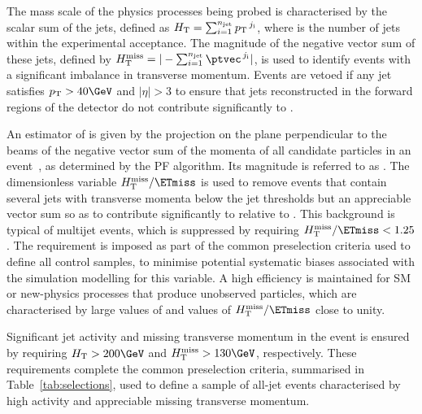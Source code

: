 The mass scale of the physics processes being probed is characterised
by the scalar \Pt sum of the jets, defined as $\scalht =
\sum_{i=1}^{\njet} \Pt^{\,j_\text{i}}$, where \njet is the number of
jets within the experimental acceptance.  The magnitude of the
negative vector \ptvec sum of these jets, defined by $\HTmiss =
|-\sum_{i=1}^{\njet} \ptvec^{\,j_\text{i}}|$, is used to identify
events with a significant imbalance in transverse momentum. Events are
vetoed if any jet satisfies $\Pt > 40\GeV$ and $|\eta| > 3$ to ensure
that jets reconstructed in the forward regions of the detector do not
contribute significantly to \HTmiss.

An estimator of \ptvecmiss is given by the projection on the plane
perpendicular to the beams of the negative vector sum of the momenta
of all candidate particles in an event~\cite{cms-met}, as determined
by the PF algorithm. Its magnitude is referred to as \ETmiss. The
dimensionless variable $\HTmiss / \ETmiss$ is used to remove events
that contain several jets with transverse momenta below the jet \Pt
thresholds but an appreciable \Pt vector sum so as to contribute
significantly to \HTmiss relative to \ETmiss. This background is
typical of multijet events, which is suppressed by requiring $\HTmiss
/ \ETmiss < 1.25$. The requirement is imposed as part of the common
preselection criteria used to define all control samples, to minimise
potential systematic biases associated with the simulation modelling
for this variable. A high efficiency is maintained for SM or
new-physics processes that produce unobserved particles, which are
characterised by large values of \ptvecmiss and values of $\HTmiss /
\ETmiss$ close to unity.

Significant jet activity and missing transverse momentum in the event
is ensured by requiring $\scalht > 200\GeV$ and $\HTmiss > 130\GeV$,
respectively. These requirements complete the common preselection
criteria, summarised in Table~\ref{tab:selections}, used to define a
sample of all-jet events characterised by high activity and
appreciable missing transverse momentum.

